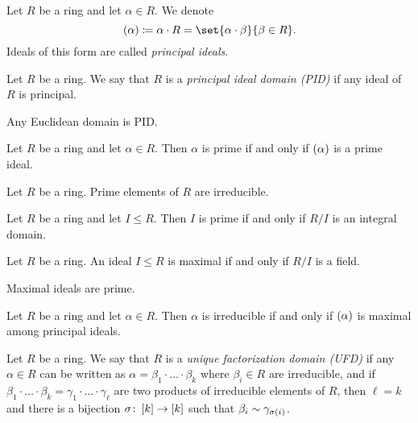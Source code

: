 \documentclass[11pt]{karticle}
\begin{document}
\begin{definition}
Let $R$ be a ring and let $\alpha \in R$. We denote
\[\prs{\alpha} \coloneqq \alpha \cdot R = \set{\alpha \cdot \beta}{\beta \in R} \text{.}\]
Ideals of this form are called \emph{principal ideals}.
\end{definition}

\begin{definition}
Let $R$ be a ring. We say that $R$ is a \emph{principal ideal domain (PID)} if any ideal of $R$ is principal.
\end{definition}

\begin{theorem}
Any Euclidean domain is PID.
\end{theorem}

\begin{lemma}
Let $R$ be a ring and let $\alpha \in R$. Then $\alpha$ is prime if and only if $\left( \alpha \right)$ is a prime ideal.
\end{lemma}

\begin{lemma}
Let $R$ be a ring. Prime elements of $R$ are irreducible.
\end{lemma}

\begin{exercise}
Let $R$ be a ring and let $I \leq R$. Then $I$ is prime if and only if $R/I$ is an integral domain.
\end{exercise}

\begin{exercise}
Let $R$ be a ring. An ideal $I \leq R$ is maximal if and only if $R/I$ is a field.
\end{exercise}

\begin{corollary}
Maximal ideals are prime.
\end{corollary}

\begin{exercise}
Let $R$ be a ring and let $\alpha \in R$. Then $\alpha$ is irreducible if and only if $\left( \alpha \right)$ is maximal among principal ideals.
\end{exercise}

\begin{definition}
Let $R$ be a ring. We say that $R$ is a \emph{unique factorization domain (UFD)} if any $\alpha \in R$ can be written as $\alpha = \beta_1 \cdot \ldots \cdot \beta_k$ where $\beta_i \in R$ are irreducible, and if $\beta_1 \cdot \ldots \cdot \beta_k = \gamma_1 \cdot \ldots \cdot \gamma_\ell$ are two products of irreducible elements  of $R$, then $\ell = k$ and there is a bijection $\sigma \colon \left[ k \right] \to \left[ k \right]$ such that $\beta_i \sim \gamma_{\sigma\left( i \right)}$.
\end{definition}
\end{document}
